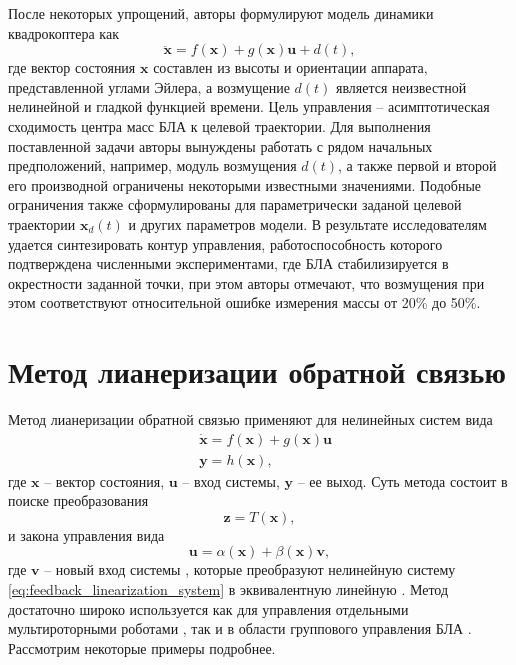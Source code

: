 После некоторых упрощений, авторы формулируют модель динамики квадрокоптера как 
\begin{equation} \label{eq:Tony_dyn}
\ddot{\bm x} = f(\bm x) + g( \bm x) \bm u + d(t),
\end{equation}
где вектор состояния $\bm x$ составлен из высоты и ориентации аппарата, представленной углами Эйлера, а возмущение $d(t)$ является неизвестной нелинейной и гладкой функцией времени. Цель управления -- асимптотическая сходимость центра масс БЛА к целевой траектории. Для выполнения поставленной задачи авторы вынуждены работать с рядом начальных предположений, например, модуль возмущения $d(t)$, а также первой и второй его производной ограничены некоторыми известными значениями. Подобные ограничения также сформулированы для параметрически заданой целевой траектории $\bm x_d(t)$ и других параметров модели. В результате исследователям удается синтезировать контур управления, работоспособность которого подтверждена численными экспериментами, где БЛА стабилизируется в окрестности заданной точки, при этом авторы отмечают, что возмущения при этом соответствуют относительной ошибке измерения массы от 20\% до 50\%.

\section{Метод лианеризации обратной связью}

Метод лианеризации обратной связью применяют для нелинейных систем вида
\begin{equation} \label{eq:feedback_linearization_system}
\begin{aligned}
&\dot{\bm x} = f(\bm x) + g(\bm x) \bm u\\
&\bm y = h(\bm x),
\end{aligned}
\end{equation}
где $\bm x$ -- вектор состояния, $\bm u$ -- вход системы, $\bm y$ -- ее выход.
Суть метода состоит в поиске преобразования 
\begin{equation} \label{eq:feedback_linearization_transform}
\bm z = T(\bm x),
\end{equation}
и закона управления вида
\begin{equation} \label{eq:feedback_linearization_control}
\bm u = \alpha(\bm x) + \beta(\bm x) \bm v,
\end{equation}
где $\bm v$ -- новый вход системы , которые преобразуют нелинейную систему \eqref{eq:feedback_linearization_system} в эквивалентную линейную \cite{Slotine01}. Метод достаточно широко используется как для управления отдельными мультироторными роботами \cite{Chang01, Freddi01}, так и в области группового управления БЛА \cite{Mahmood01}. Рассмотрим некоторые примеры подробнее.

